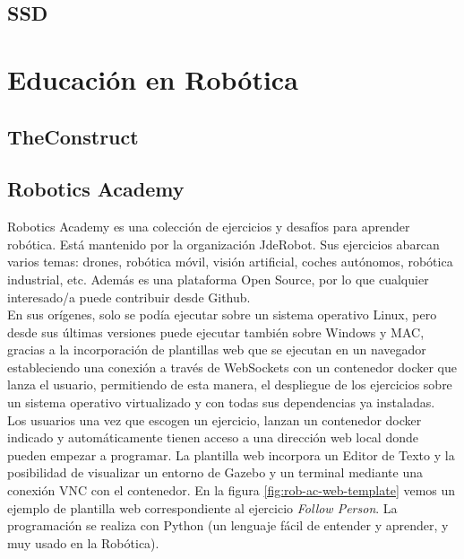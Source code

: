 \subsection{SSD}
\label{subsec:SSD}

\section{Educación en Robótica}
\label{sec:educacion_robotica}

\subsection{TheConstruct}
\label{sec:the_construct}

\subsection{Robotics Academy}
\label{sec:robotics_academy}
Robotics Academy \cite{robotics-academy} es una colección de ejercicios y desafíos para aprender robótica. Está mantenido por la organización JdeRobot. Sus ejercicios abarcan varios temas: drones, robótica móvil, visión artificial, coches autónomos, robótica industrial, etc. Además es una plataforma Open Source, por lo que cualquier interesado/a puede contribuir desde Github.\\

En sus orígenes, solo se podía ejecutar sobre un sistema operativo Linux, pero desde sus últimas versiones puede ejecutar también sobre Windows y MAC, gracias a la incorporación de plantillas web que se ejecutan en un navegador estableciendo una conexión a través de WebSockets con un contenedor docker que lanza el usuario, permitiendo de esta manera, el despliegue de los ejercicios sobre un sistema operativo virtualizado y con todas sus dependencias ya instaladas.\\

Los usuarios una vez que escogen un ejercicio, lanzan un contenedor docker indicado y automáticamente tienen acceso a una dirección web local donde pueden empezar a programar. La plantilla web incorpora un Editor de Texto y la posibilidad de visualizar un entorno de Gazebo y un terminal mediante una conexión VNC con el contenedor. En la figura \ref{fig:rob-ac-web-template} vemos un ejemplo de plantilla web correspondiente al ejercicio \textit{Follow Person}. La programación se realiza con Python (un lenguaje fácil de entender y aprender, y muy usado en la Robótica).\\

